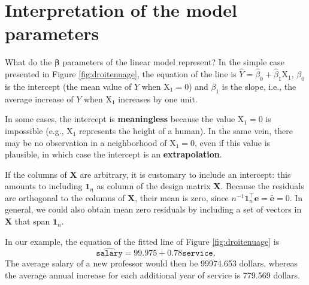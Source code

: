 \documentclass[
  11pt,
  letterpaper,
]{book}
\theoremstyle{definition}
\theoremstyle{definition}
\theoremstyle{definition}
\theoremstyle{remark}
\begin{document}
\hypertarget{interpretation-of-the-model-parameters}{%
\section{Interpretation of the model parameters}\label{interpretation-of-the-model-parameters}}

What do the \(\boldsymbol{\beta}\) parameters of the linear model represent? In the simple case presented in Figure \ref{fig:droitenuage}, the equation of the line is \(\widehat{Y} = \widehat{\beta}_0 + \widehat{\beta}_1\mathrm{X}_1\), \(\beta_0\) is the intercept (the mean value of \(Y\) when \(\mathrm{X}_1=0\)) and \(\beta_1\) is the slope, i.e., the average increase of \(Y\) when \(\mathrm{X}_1\) increases by one unit.

In some cases, the intercept is \textbf{meaningless} because the value \(\mathrm{X}_1=0\) is impossible (e.g., \(\mathrm{X}_1\) represents the height of a human). In the same vein, there may be no observation in a neighborhood of \(\mathrm{X}_1=0\), even if this value is plausible, in which case the intercept is an \textbf{extrapolation}.

If the columns of \(\mathbf{X}\) are arbitrary, it is customary to include an intercept: this amounts to including \(\mathbf{1}_n\) as column of the design matrix \(\mathbf{X}\). Because the residuals are orthogonal to the columns of \(\mathbf{X}\), their mean is zero, since \(n^{-1}\mathbf{1}_n^\top\boldsymbol{e}=\bar{\boldsymbol{e}}=0\). In general, we could also obtain mean zero residuals by including a set of vectors in \(\mathbf{X}\) that span \(\mathbf{1}_n\).

In our example, the equation of the fitted line of Figure \ref{fig:droitenuage} is \[\widehat{\texttt{salary}} = 99.975 + 0.78\texttt{service}.\]
The average salary of a new professor would then be 99974.653 dollars, whereas the average annual increase for each additional year of service is 779.569 dollars.
\end{document}
